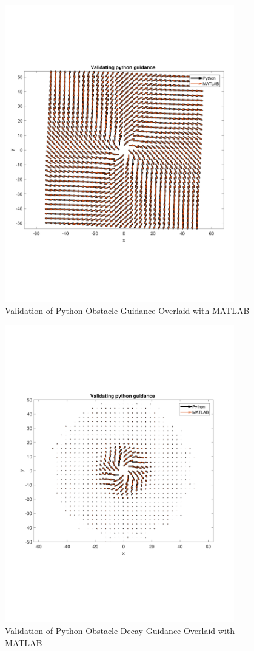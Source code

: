 \documentclass[numbered,pdftex]{ohio-etd}
\begin{document}
\begin{figure}
	\centering
	\includegraphics[trim=0 140 0 140,clip,width=10cm]{PaperFigures/Methods/resultsPython/obstacle}
	\caption{Validation of Python Obstacle Guidance Overlaid with MATLAB}
	\label{fig:valPythonAvoidance}
\end{figure}

\begin{figure}[H]
	\centering
	\includegraphics[trim=0 140 0 140,clip,width=10cm]{PaperFigures/Methods/resultsPython/obstacleWithDecayAndCirculation}
	\caption{Validation of Python Obstacle Decay Guidance Overlaid with MATLAB}
	\label{fig:valPythonAvoidanceDecay}
\end{figure}
\end{document}
